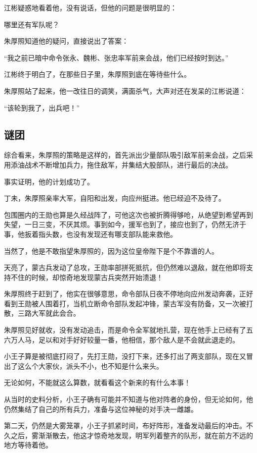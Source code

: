 \begin{multicols}{\theparacolNo}
江彬疑惑地看着他，没有说话，但他的问题是很明显的：

哪里还有军队呢？

朱厚照知道他的疑问，直接说出了答案：

“我之前已暗中命令张永、魏彬、张忠率军前来会战，他们已经按时到达。”

江彬终于明白了，在那些日子里，朱厚照到底在等待些什么。

朱厚照站了起来，他一改往日的调笑，满面杀气，大声对还在发呆的江彬说道：

“该轮到我了，出兵吧！”

\subsection{谜团}
综合看来，朱厚照的策略是这样的，首先派出少量部队吸引敌军前来会战，之后采用添油战术不断增加兵力，拖住敌军，并集结大股部队，进行最后的决战。

事实证明，他的计划成功了。

丁未，朱厚照亲率大军，自阳和出发，向应州挺进。他已经迫不及待了。

包围圈内的王勋也算是久经战阵了，可他这次也被折腾得够呛，从绝望到希望再到失望，一日三变，不厌其烦。事到如今，援军也到了，接应也到了，仍然无济于事，他扳着指头数，也没有发现还有哪支部队能来救他。

当然了，他是不敢指望朱厚照的，因为这位皇帝陛下是个不靠谱的人。

天亮了，蒙古兵发动了总攻，王勋率部拼死抵抗，但仍然难以退敌，就在他即将支持不住的时候，却惊奇地发现蒙古兵突然开始溃退！

朱厚照终于赶到了，他实在很够意思，命令部队日夜不停地向应州发动奔袭，正好看到王勋被人围着打，当机立断命令部队发起冲锋，蒙古军没有防备，又一次被打散，三路大军就此会合。

朱厚照见好就收，没有发动追击，而是命令全军就地扎营，现在他手上已经有了五六万人马，足以和对手好好较量一番，他相信，那个敌人是不会就此退走的。

小王子算是被彻底打闷了，先打王勋，没打下来，还多打出了两支部队，现在又冒出了这么个大家伙，派头不小，也不知是什么来头。

无论如何，不能就这么算数，就看看这个新来的有什么本事！

从当时的史料分析，小王子确有可能并不知道与他对阵者的身份，但无论如何，他仍然集结了自己的所有兵力，准备与这位神秘的对手决一雌雄。

第二天，仍然是大雾笼罩，小王子抓紧时间，布好阵形，准备发动最后的冲击。不久之后，雾渐渐散去，他这才惊奇地发现，明军列着整齐的队形，就在前方不远的地方等待着他。


\end{multicols}
